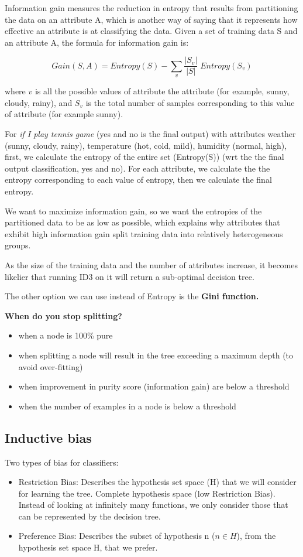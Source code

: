 \documentclass[12pt]{report}
\begin{document}
Information gain measures the reduction in entropy that results from partitioning the data on an attribute A, which is another way of saying that it represents how effective an attribute is at classifying the data. Given a set of training data S and an attribute A, the formula for information gain is:

\begin{equation}
	Gain(S,A)  = Entropy(S) - \sum_v  \frac{|S_v|}{|S|} \; Entropy(S_v)
\end{equation}


where $v$ is all the possible values of attribute the attribute (for example, sunny, cloudy, rainy), and $S_v$ is the total number of samples corresponding to this value of attribute (for example sunny).

For \textit{if I play tennis game} (yes and no is the final output) with attributes weather (sunny, cloudy, rainy), temperature (hot, cold, mild), humidity (normal, high),  first, we calculate the entropy of the entire set (Entropy(S)) (wrt the the final output classification, yes and no). For each attribute, we calculate the the entropy corresponding to each value of entropy, then we calculate the final entropy.


We want to maximize information gain, so we want the entropies of the partitioned data to be as low as possible, which explains why attributes that exhibit high information gain split training data into relatively heterogeneous groups.

As the size of the training data and the number of attributes increase, it becomes likelier that running ID3 on it will return a sub-optimal decision tree.


The other option we can use instead of Entropy is the \textbf{Gini function.}

\hfill \break
\textbf{When do you stop splitting?}
\begin{itemize}
	\item when a node is 100\% pure
	\item when splitting a node will result in the tree exceeding a maximum depth (to avoid over-fitting)
	\item when improvement in purity score (information gain) are below a threshold
	\item when the number of examples in a node is below a threshold
\end{itemize}

\subsection{Inductive bias}
Two types of bias for classifiers:
\begin{itemize}
	\item Restriction Bias: Describes the hypothesis set space (H) that we will consider for learning the tree.
	Complete hypothesis space (low Restriction Bias). Instead of looking at infinitely many functions, we only consider those that can be represented by the decision tree.
	\item Preference Bias: Describes the subset of hypothesis n ($n \in H $), from the hypothesis set space H, that we prefer.
\end{itemize}
\end{document}
